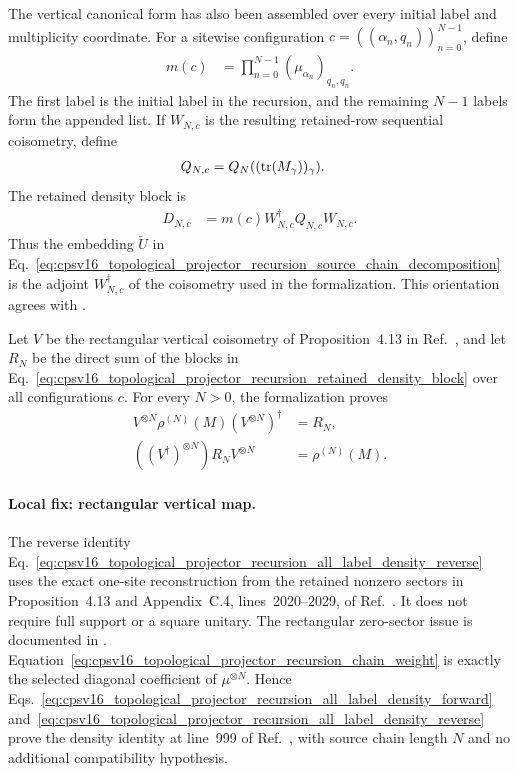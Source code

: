 \documentclass{article}
\begin{document}
The vertical canonical form has also been assembled over every initial label
and multiplicity coordinate. For a sitewise configuration
$c=((\alpha_n,q_n))_{n=0}^{N-1}$, define
\begin{align}
    m(c)
    &=\prod_{n=0}^{N-1}(\mu_{\alpha_n})_{q_n,q_n}.
    \label{eq:cpsv16_topological_projector_recursion_chain_weight}
\end{align}
The first label is the initial label in the recursion, and the remaining
$N-1$ labels form the appended list. If $W_{N,c}$ is the resulting
retained-row sequential coisometry, define
\begin{align}
    Q_{N,c}
    &=Q_N((\operatorname{tr}(M_\gamma))_\gamma).
    \label{eq:cpsv16_topological_projector_recursion_configuration_terminal_q}
\end{align}
The retained density block is
\begin{align}
    D_{N,c}
    &=m(c)W_{N,c}^\dagger Q_{N,c}W_{N,c}.
    \label{eq:cpsv16_topological_projector_recursion_retained_density_block}
\end{align}
Thus the embedding $\widetilde U$ in
Eq.~\ref{eq:cpsv16_topological_projector_recursion_source_chain_decomposition}
is the adjoint $W_{N,c}^\dagger$ of the coisometry used in the formalization.
This orientation agrees with
.

Let $V$ be the rectangular vertical coisometry of Proposition~4.13 in
Ref.~\cite{Cirac2016MPDO_arXiv}, and let $R_N$ be the direct sum of the blocks
in Eq.~\ref{eq:cpsv16_topological_projector_recursion_retained_density_block}
over all configurations $c$. For every $N>0$, the formalization proves
\begin{align}
    V^{\otimes N}\rho^{(N)}(M)(V^{\otimes N})^\dagger
    &=R_N,
    \label{eq:cpsv16_topological_projector_recursion_all_label_density_forward}\\
    ((V^\dagger)^{\otimes N})R_NV^{\otimes N}
    &=\rho^{(N)}(M).
    \label{eq:cpsv16_topological_projector_recursion_all_label_density_reverse}
\end{align}

\paragraph{Local fix: rectangular vertical map.}
The reverse identity
Eq.~\ref{eq:cpsv16_topological_projector_recursion_all_label_density_reverse}
uses the exact one-site reconstruction from the retained nonzero sectors in
Proposition~4.13 and Appendix~C.4, lines~2020--2029, of
Ref.~\cite{Cirac2016MPDO_arXiv}. It does not require full support or a square
unitary. The rectangular zero-sector issue is documented in
.
Equation~\ref{eq:cpsv16_topological_projector_recursion_chain_weight} is
exactly the selected diagonal coefficient of $\mu^{\otimes N}$. Hence
Eqs.~\ref{eq:cpsv16_topological_projector_recursion_all_label_density_forward}
and~\ref{eq:cpsv16_topological_projector_recursion_all_label_density_reverse}
prove the density identity at line~999 of
Ref.~\cite{Cirac2016MPDO_arXiv}, with source chain length $N$ and no additional
compatibility hypothesis.
\end{document}
